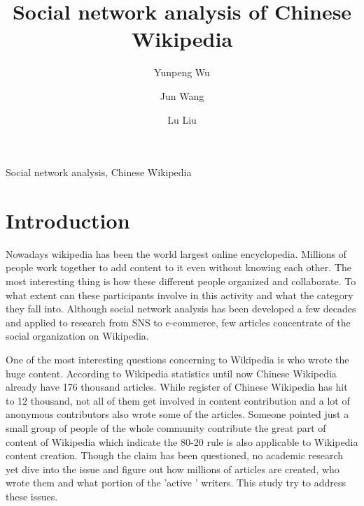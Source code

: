 \documentclass{elsarticle}
\begin{document}
\begin{frontmatter}
  \title{Social network analysis of Chinese Wikipedia }

  \author[buaa]{Yunpeng Wu}
  \author[buaa]{Jun Wang}
  \author[buaa]{Lu Liu}
  

  \address[buaa]{School of Economics \& Management, Beihang University, 
    Beijing 100083, P.R. China}
  
  \begin{abstract}
    
  \end{abstract}

  \begin{keyword}
    Social network analysis, Chinese Wikipedia
  \end{keyword}

\end{frontmatter}

\listoftodos
\section{Introduction}
\label{sec:introduction}
Nowadays wikipedia has been the world largest online
encyclopedia. Millions of people work together to add content to it
even without knowing each other. The most interesting thing is how
these different people organized and collaborate. To what extent can
these participants involve in this activity and what the category they
fall into. Although social network analysis has been developed a few
decades and applied to research from SNS to e-commerce, few articles
concentrate of the social organization on Wikipedia.

One of the most interesting questions concerning to Wikipedia is who
wrote the huge content. According to Wikipedia statistics until now
Chinese Wikipedia already have 176 thousand articles\cite{wikistat}.
While  register of Chinese Wikipedia has hit to  12
thousand, not all of them get involved in content contribution and
a lot of anonymous contributors also wrote some of the
articles. Someone pointed just a small group of people of the whole
community contribute the great part of content of Wikipedia which
indicate the 80-20 rule is also applicable to Wikipedia content
creation\cite{aswartz}. Though the claim has been questioned, no
academic research yet dive into the issue and figure out how millions
of articles are created, who wrote them and what portion of the
'active ' writers. This study try to address these issues.
\end{document}
